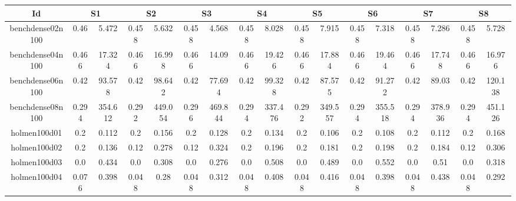 \documentclass[landscape, 12pt]{report}
\begin{document}
	\begin{tabular}{|c|cc|cc|cc|cc|cc|cc|cc|cc|}
	\hline
	\multicolumn{1}{|c|}{Id} & \multicolumn{2}{|c|}{S1} & \multicolumn{2}{|c|}{S2} & \multicolumn{2}{|c|}{S3} & \multicolumn{2}{|c|}{S4} & \multicolumn{2}{|c|}{S5} & \multicolumn{2}{|c|}{S6} & \multicolumn{2}{|c|}{S7} & \multicolumn{2}{|c|}{S8}
	\\
	\hline
	benchdense02n100 & 0.46 & 5.472 & 0.458 & 5.632 & 0.458 & 4.568 & 0.458 & 8.028 & 0.458 & 7.915 & 0.458 & 7.318 & 0.458 & 7.286 & 0.458 & 5.728
	\\
	benchdense04n100 & 0.466 & 17.324 & 0.466 & 16.998 & 0.466 & 14.09 & 0.466 & 19.426 & 0.466 & 17.884 & 0.466 & 19.464 & 0.466 & 17.748 & 0.466 & 16.976
	\\
	benchdense06n100 & 0.42 & 93.578 & 0.42 & 98.642 & 0.42 & 77.694 & 0.42 & 99.328 & 0.42 & 87.575 & 0.42 & 91.272 & 0.42 & 89.03 & 0.42 & 120.138
	\\
	benchdense08n100 & 0.294 & 354.612 & 0.292 & 449.054 & 0.296 & 469.844 & 0.294 & 337.476 & 0.292 & 349.557 & 0.294 & 355.518 & 0.294 & 378.936 & 0.294 & 451.126
	\\
	holmen100d01 &  0.2 & 0.112 &  0.2 & 0.156 &  0.2 & 0.128 &  0.2 & 0.134 &  0.2 & 0.106 &  0.2 & 0.108 &  0.2 & 0.112 &  0.2 & 0.168
	\\
	holmen100d02 &  0.2 & 0.136 & 0.12 & 0.278 & 0.12 & 0.324 &  0.2 & 0.196 &  0.2 & 0.181 &  0.2 & 0.198 &  0.2 & 0.184 & 0.12 & 0.306
	\\
	holmen100d03 &  0.0 & 0.434 &  0.0 & 0.308 &  0.0 & 0.276 &  0.0 & 0.508 &  0.0 & 0.489 &  0.0 & 0.552 &  0.0 & 0.51 &  0.0 & 0.318
	\\
	holmen100d04 & 0.076 & 0.398 & 0.048 & 0.28 & 0.048 & 0.312 & 0.048 & 0.408 & 0.048 & 0.416 & 0.048 & 0.398 & 0.048 & 0.438 & 0.048 & 0.292
	\\
	\hline 
	 \end{tabular}
	
	
	
\end{document}
